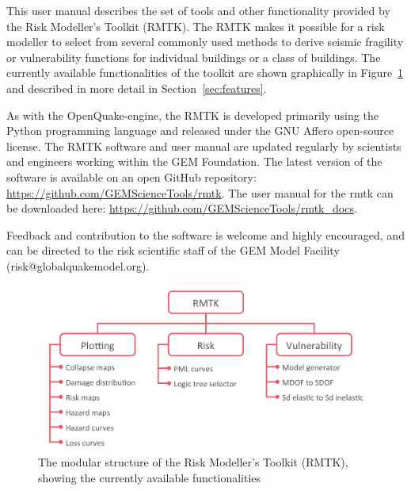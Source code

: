 This user manual describes the set of tools and other functionality provided by the Risk Modeller's Toolkit (RMTK). The RMTK makes it possible for a risk modeller to select from several commonly used methods to derive seismic fragility or vulnerability functions for individual buildings or a class of buildings. The currently available functionalities of the toolkit are shown graphically in Figure~\ref{fig:rmtk-structure} and described in more detail in Section~\ref{sec:features}.

As with the OpenQuake-engine, the RMTK is developed primarily using the Python programming language and released under the GNU Affero open-source license. The RMTK software and user manual are updated regularly by scientists and engineers working within the GEM Foundation. The latest version of the software is available on an open GitHub repository: \href{https://github.com/GEMScienceTools/rmtk}{https://github.com/GEMScienceTools/rmtk}. The user manual for the rmtk can be downloaded here: \href{https://github.com/GEMScienceTools/rmtk_docs}{https://github.com/GEMScienceTools/rmtk\_docs}.

Feedback and contribution to the software is welcome and highly encouraged, and can be directed to the risk scientific staff of the GEM Model Facility (risk@globalquakemodel.org).

\begin{figure}[!htbp]
	\centering
	\includegraphics[width=\textwidth]{figures/rmtk_structure.png}
	\caption{The modular structure of the Risk Modeller's Toolkit (RMTK), showing the currently available functionalities}
	\label{fig:rmtk-structure}
\end{figure}